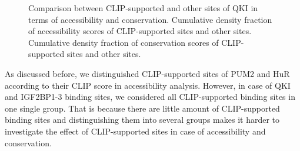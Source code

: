 \begin{figure}[H]
	\centering
\quad
\caption[Accessibility and conservation scores of QKI protein]{Comparison between CLIP-supported and other sites of QKI in terms of accessibility and conservation.  Cumulative density fraction of accessibility scores of CLIP-supported sites and other sites.  Cumulative density fraction of conservation scores of CLIP-supported sites and other sites.}
\label{QKI_accessibility_and_conserv}
\end{figure}

As discussed before, we distinguished CLIP-supported sites of PUM2 and HuR according to their CLIP score in accessibility analysis. However, in case of QKI and IGF2BP1-3 binding sites, we considered all CLIP-supported binding sites in one single group. That is because there are little amount of CLIP-supported binding sites and distinguishing them into several groups makes it harder to investigate the effect of CLIP-supported sites in case of accessibility and conservation.

